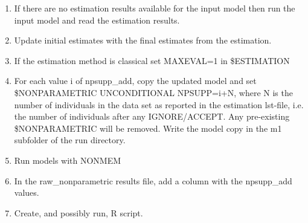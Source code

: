 \begin{enumerate}
\item If there are no estimation results available for the input model then run the input model and read the estimation results.

\item Update initial estimates with the final estimates from the estimation.

\item If the estimation method is classical set MAXEVAL=1 in \$ESTIMATION 

\item For each value i of npsupp\_add, copy the updated model and set \$NONPARAMETRIC UNCONDITIONAL NPSUPP=i+N,
where N is the number of individuals in the data set as reported in the estimation lst-file, i.e. the number
of individuals after any IGNORE/ACCEPT. Any pre-existing \$NONPARAMETRIC will be removed.
Write the model copy in the m1 subfolder of the run directory.
\item Run models with NONMEM
\item In the raw\_nonparametric results file, add a column with the npsupp\_add values. %
\item Create, and possibly run, R script. 
\end{enumerate}



